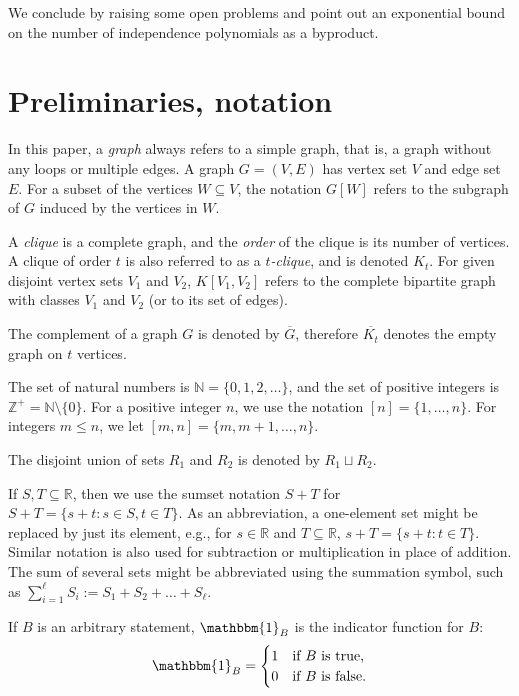 \documentclass[10pt,a4paper]{article}
\numberwithin{equation}{section}
\newcommand{\nn}{\mathbb{N}}
\newcommand{\zz}{\mathbb{Z}}
\newcommand{\rr}{\mathbb{R}}
\begin{document}
We conclude by raising some open problems and point out an exponential bound on the number of independence polynomials as a byproduct.

\section{Preliminaries, notation}

In this paper, a \textit{graph} always refers to a simple graph, that is, a graph without any loops or multiple edges. A graph $G=(V,E)$ has vertex set $V$ and edge set $E$. For a subset of the vertices $W\subseteq V$, the notation $G[W]$ refers to the subgraph of $G$ induced by the vertices in $W$.

A \textit{clique} is a complete graph, and the \textit{order} of the clique is its number of vertices. A clique of order $t$ is also referred to as a \textit{$t$-clique}, and is denoted $K_t$. For given disjoint vertex sets $V_1$ and $V_2$, $K[V_1,V_2]$ refers to the complete bipartite graph with classes $V_1$ and $V_2$ (or to its set of edges).

The complement of a graph $G$ is denoted by $\overline{G}$, therefore $\overline{K_t}$ denotes the empty graph on $t$ vertices.

The set of natural numbers is $\nn=\{0,1,2, \dots\}$, and the set of positive integers is $\zz^{+}=\nn\setminus \{0\}$. For a positive integer $n$, we use the notation $[n]=\{1, \dots, n\}$. For integers $m\le n$, we let $[m,n]=\{m, m+1, \dots, n\}$.

The disjoint union of sets $R_1$ and $R_2$ is denoted by $R_1\sqcup R_2$.

If $S,T\subseteq \rr$, then we use the sumset notation $S+T$ for $S+T=\{s+t: s\in S, t\in T\}$. As an abbreviation, a one-element set might be replaced by just its element, e.g., for $s\in \rr$ and $T\subseteq \rr$, $s+T=\{s+t: t\in T\}$. Similar notation is also used for subtraction or multiplication in place of addition. The sum of several sets might be abbreviated using the summation symbol, such as $\sum_{i=1}^{\ell} S_i := S_1+S_2+\ldots+S_{\ell}$.

If $B$ is an arbitrary statement, $\mathbbm{1}_B$ is the indicator function for $B$:
\begin{equation*}
\mathbbm{1}_B=
\begin{cases}
1 & \text{if $B$ is true,}\\
0 & \text{if $B$ is false.}\\
\end{cases}
\end{equation*}
\end{document}
